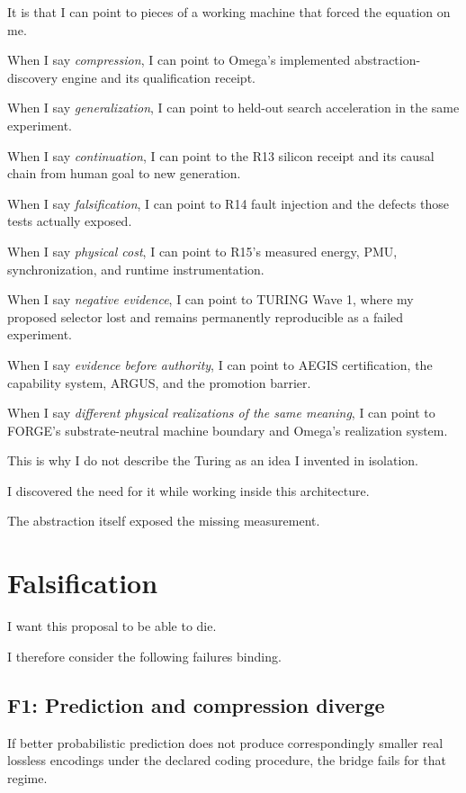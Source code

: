 \documentclass[11pt]{article}
\begin{document}
It is that I can point to pieces of a working machine that forced the equation on me.

When I say \emph{compression}, I can point to Omega's implemented abstraction-discovery engine and its qualification receipt.

When I say \emph{generalization}, I can point to held-out search acceleration in the same experiment.

When I say \emph{continuation}, I can point to the R13 silicon receipt and its causal chain from human goal to new generation.

When I say \emph{falsification}, I can point to R14 fault injection and the defects those tests actually exposed.

When I say \emph{physical cost}, I can point to R15's measured energy, PMU, synchronization, and runtime instrumentation.

When I say \emph{negative evidence}, I can point to TURING Wave 1, where my proposed selector lost and remains permanently reproducible as a failed experiment.

When I say \emph{evidence before authority}, I can point to AEGIS certification, the capability system, ARGUS, and the promotion barrier.

When I say \emph{different physical realizations of the same meaning}, I can point to FORGE's substrate-neutral machine boundary and Omega's realization system.

This is why I do not describe the Turing as an idea I invented in isolation.

I discovered the need for it while working inside this architecture.

The abstraction itself exposed the missing measurement.

\section{Falsification}

I want this proposal to be able to die.

I therefore consider the following failures binding.

\subsection{F1: Prediction and compression diverge}

If better probabilistic prediction does not produce correspondingly smaller real lossless encodings under the declared coding procedure, the bridge fails for that regime.
\end{document}
